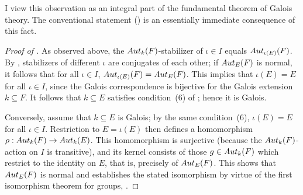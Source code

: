 I view this observation as an integral part of the fundamental theorem
of Galois theory. The conventional statement ()
is an essentially immediate consequence of this fact.
\begin{proof}[Proof of ]
  As observed above, the $Aut_k(F)$-stabilizer of $\iota \in I$
  equals $Aut_{\iota(E)}(F)$. By
  , stabilizers of different
  $\iota$ are conjugates of each other; if $Aut_E(F)$ is normal, it
  follows that for all $\iota \in I$,
  $Aut_{\iota(E)}(F) = Aut_E(F)$.  This implies that $\iota(E) = E$
  for all $\iota \in I$, since the Galois correspondence is bijective
  for the Galois extension $k \subseteq F$. It follows that
  $k \subseteq E$ satisfies condition~(6) of ;
  hence it is Galois.

  Conversely, assume that $k \subseteq E$ is Galois; by the same
  condition~(6), $\iota(E) = E$ for all $\iota \in I$. Restriction to
  $E = \iota(E)$ then defines a homomorphism
  $\rho : Aut_k(F) \to Aut_k(E)$.  This homomorphism is surjective
  (because the $Aut_k(F)$-action on $I$ is transitive), and its
  kernel consists of those $g \in Aut_k(F)$ which restrict to the
  identity on $E$, that is, precisely of $Aut_E(F)$. This shows that
  $Aut_E(F)$ is normal and establishes the stated isomorphism by
  virtue of the first isomorphism theorem for groups,
  .
\end{proof}
